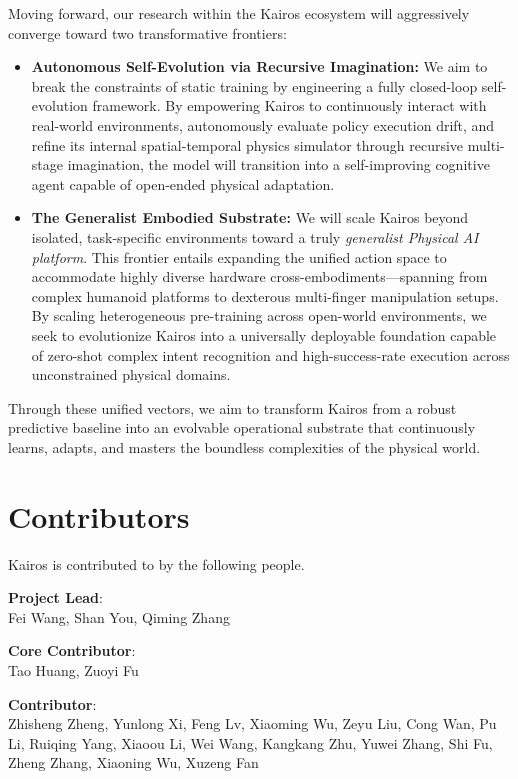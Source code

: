 \documentclass[11pt]{academic_template}
\theoremstyle{definition}
\begin{document}
Moving forward, our research within the Kairos ecosystem will aggressively converge toward two transformative frontiers:
\begin{itemize}
    \item \textbf{Autonomous Self-Evolution via Recursive Imagination:} We aim to break the constraints of static training by engineering a fully closed-loop self-evolution framework. By empowering Kairos to continuously interact with real-world environments, autonomously evaluate policy execution drift, and refine its internal spatial-temporal physics simulator through recursive multi-stage imagination, the model will transition into a self-improving cognitive agent capable of open-ended physical adaptation.
    \item \textbf{The Generalist Embodied Substrate:} We will scale Kairos beyond isolated, task-specific environments toward a truly \textit{generalist Physical AI platform}. This frontier entails expanding the unified action space to accommodate highly diverse hardware cross-embodiments—spanning from complex humanoid platforms to dexterous multi-finger manipulation setups. By scaling heterogeneous pre-training across open-world environments, we seek to evolutionize Kairos into a universally deployable foundation capable of zero-shot complex intent recognition and high-success-rate execution across unconstrained physical domains.
\end{itemize}
Through these unified vectors, we aim to transform Kairos from a robust predictive baseline into an evolvable operational substrate that continuously learns, adapts, and masters the boundless complexities of the physical world.




\newpage



\newpage
\beginappendix
\setcounter{section}{0} %

\section{Contributors}

Kairos is contributed to by the following people.


\textbf{Project Lead}: \\
Fei Wang, Shan You, Qiming Zhang

\textbf{Core Contributor}: \\
Tao Huang, Zuoyi Fu

\textbf{Contributor}: \\
Zhisheng Zheng, Yunlong Xi, Feng Lv, Xiaoming Wu, Zeyu Liu, Cong Wan, Pu Li, Ruiqing Yang, Xiaoou Li, Wei Wang, Kangkang Zhu, Yuwei Zhang, Shi Fu, Zheng Zhang, Xiaoning Wu, Xuzeng Fan
\end{document}
